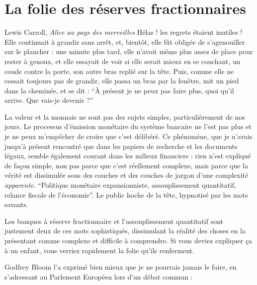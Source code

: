 \chapter{La folie des réserves fractionnaires}
\label{les:13}

\begin{chapquote}{Lewis Carroll, \textit{Alice au pays des merveilles}}
Hélas ! les regrets étaient inutiles ! Elle continuait à grandir sans arrêt, et,
bientôt, elle fût obligée de s’agenouiller sur le plancher : une minute plus
tard, elle n’avait même plus assez de place pour rester à genoux, et elle
essayait de voir si elle serait mieux en se couchant, un coude contre la porte,
son autre bras replié sur la tête. Puis, comme elle ne cessait toujours pas de
grandir, elle passa un bras par la fenêtre, mit un pied dans la cheminée, et se
dit : \enquote{À présent je ne peux pas faire plus, quoi qu’il arrive. Que
vais-je devenir ?}
\end{chapquote}

La valeur et la monnaie ne sont pas des sujets simples, particulièrement de nos
jours. Le processus d'émission monétaire du système bancaire ne l'est pas plus
et je ne peux m'empêcher de croire que c'est délibéré. Ce phénomène, que je
n'avais jusqu'à présent rencontré que dans les papiers de recherche et les
documents légaux, semble également courant dans les milieux financiers : rien
n'est expliqué de façon simple, non pas parce que c'est réellement complexe,
mais parce que la vérité est dissimulée sous des couches et des couches de
jargon d'une complexité \textit{apparente}. \enquote{Politique monétaire
expansionniste, assouplissement quantitatif, relance fiscale de l'économie}. Le
public hoche de la tête, hypnotisé par les mots savants.

Les banques à réserve fractionnaire et l'assouplissement quantitatif sont
justement deux de ces mots sophistiqués, dissimulant la réalité des choses en la
présentant comme complexe et difficile à comprendre. Si vous deviez expliquer ça
à un enfant, vous verriez rapidement la folie qu'ils renferment.

Godfrey Bloom l'a exprimé bien mieux que je ne pourrais jamais le faire, en
s'adressant au Parlement Européen lors d'un débat commun :


